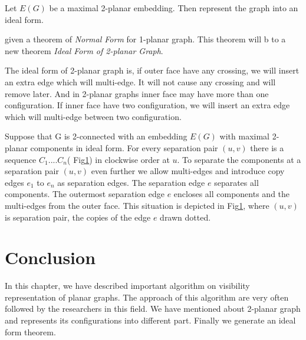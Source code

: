 \begin{lemma}

Let $E(G)$ be a maximal 2-planar embedding. Then represent the graph into an ideal form. 

\end{lemma}

\cite{alam} given a theorem  of \emph{Normal Form} for 1-planar graph. This theorem will b to a new theorem \emph{Ideal Form of 2-planar Graph}.


\begin{theorem}
The ideal form of 2-planar graph is, if outer face have any crossing, we will insert an extra edge which will multi-edge. It will not cause any crossing and will remove later. And in 2-planar graphs inner face may have more than one configuration. If inner face have two configuration, we will insert an extra edge which will multi-edge between two configuration.
\end{theorem}



\begin{figure}[!tb]
\centering
\resizebox{100mm}{!}{}

\label{fig:component}
\end{figure}




Suppose that G is 2-connected with an embedding $E(G)$ with maximal 2-planar components in ideal form. For every separation pair $(u,v)$ there is a sequence  $C_1.... C_{n}$( Fig\ref{fig:component}) in clockwise order at $u$. To separate the components at a separation pair $(u,v)$ even further we allow multi-edges and introduce copy edges $e_1$ to $e_n$ as separation edges. The separation edge $e$ separates all components. The outermost separation edge $e$ encloses all components and the multi-edges from the outer face. This situation is depicted in Fig\ref{fig:component}, where $(u , v)$ is separation pair, the copies of the edge $e$ drawn dotted.

\section{Conclusion}
In this chapter, we have described important algorithm on visibility representation of planar graphs. The approach of this algorithm are very often followed by the researchers in this field. We have mentioned
about 2-planar graph and represents its configurations into different part. Finally we generate an ideal form theorem.




\endinput

